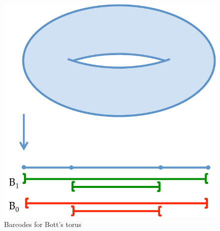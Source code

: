 \begin{ex}

\begin{figure}[ht]
\centering
\includegraphics[width=.7\textwidth]{torus_bc.pdf}
\caption{Barcodes for Bott's torus}
\label{fig:torus_bc}
\end{figure}


\end{ex}
